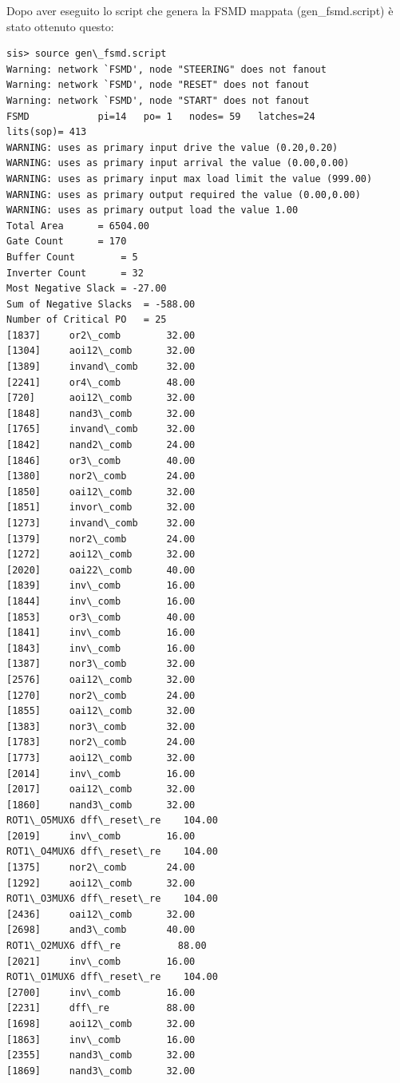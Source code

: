 \documentclass[a4paper,titlepage]{book}
\begin{document}
Dopo aver eseguito lo script che genera la FSMD mappata (gen\_fsmd.script) è stato ottenuto questo:

\begin{lstlisting}
sis> source gen\_fsmd.script
Warning: network `FSMD', node "STEERING" does not fanout
Warning: network `FSMD', node "RESET" does not fanout
Warning: network `FSMD', node "START" does not fanout
FSMD          	pi=14	po= 1	nodes= 59	latches=24
lits(sop)= 413
WARNING: uses as primary input drive the value (0.20,0.20)
WARNING: uses as primary input arrival the value (0.00,0.00)
WARNING: uses as primary input max load limit the value (999.00)
WARNING: uses as primary output required the value (0.00,0.00)
WARNING: uses as primary output load the value 1.00
Total Area		= 6504.00
Gate Count		= 170
Buffer Count		= 5
Inverter Count 		= 32
Most Negative Slack	= -27.00
Sum of Negative Slacks	= -588.00
Number of Critical PO	= 25
[1837]     or2\_comb        32.00	
[1304]     aoi12\_comb      32.00	
[1389]     invand\_comb     32.00	
[2241]     or4\_comb        48.00	
[720]      aoi12\_comb      32.00	
[1848]     nand3\_comb      32.00	
[1765]     invand\_comb     32.00	
[1842]     nand2\_comb      24.00	
[1846]     or3\_comb        40.00	
[1380]     nor2\_comb       24.00	
[1850]     oai12\_comb      32.00	
[1851]     invor\_comb      32.00	
[1273]     invand\_comb     32.00	
[1379]     nor2\_comb       24.00	
[1272]     aoi12\_comb      32.00	
[2020]     oai22\_comb      40.00	
[1839]     inv\_comb        16.00	
[1844]     inv\_comb        16.00	
[1853]     or3\_comb        40.00	
[1841]     inv\_comb        16.00	
[1843]     inv\_comb        16.00	
[1387]     nor3\_comb       32.00	
[2576]     oai12\_comb      32.00	
[1270]     nor2\_comb       24.00	
[1855]     oai12\_comb      32.00	
[1383]     nor3\_comb       32.00	
[1783]     nor2\_comb       24.00	
[1773]     aoi12\_comb      32.00	
[2014]     inv\_comb        16.00	
[2017]     oai12\_comb      32.00	
[1860]     nand3\_comb      32.00	
ROT1\_O5MUX6 dff\_reset\_re    104.00	
[2019]     inv\_comb        16.00	
ROT1\_O4MUX6 dff\_reset\_re    104.00	
[1375]     nor2\_comb       24.00	
[1292]     aoi12\_comb      32.00	
ROT1\_O3MUX6 dff\_reset\_re    104.00	
[2436]     oai12\_comb      32.00	
[2698]     and3\_comb       40.00	
ROT1\_O2MUX6 dff\_re          88.00	
[2021]     inv\_comb        16.00	
ROT1\_O1MUX6 dff\_reset\_re    104.00	
[2700]     inv\_comb        16.00	
[2231]     dff\_re          88.00	
[1698]     aoi12\_comb      32.00	
[1863]     inv\_comb        16.00	
[2355]     nand3\_comb      32.00	
[1869]     nand3\_comb      32.00	

\end{lstlisting}
\end{document}
